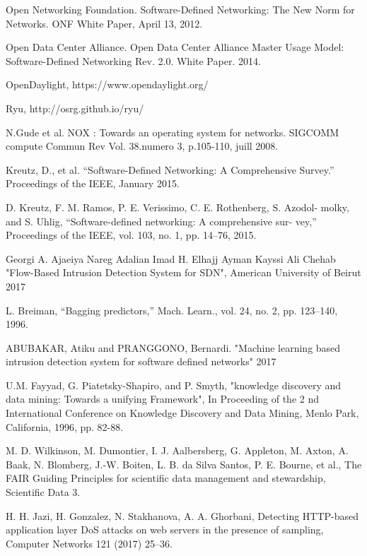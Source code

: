 \frontmatter
\begin{thebibliography}{9}

\bibitem{} 
Open Networking Foundation. Software-Defined Networking: The New Norm
for Networks. ONF White Paper, April 13, 2012.

\bibitem{} 
Open Data Center Alliance. Open Data Center
Alliance Master Usage Model: Software-Defined
Networking Rev. 2.0. White Paper. 2014.

\bibitem{} 
OpenDaylight, https://www.opendaylight.org/

\bibitem{} 
Ryu, http://osrg.github.io/ryu/

\bibitem{}
N.Gude et al. NOX : Towards an operating system for networks. SIGCOMM compute
Commun Rev Vol. 38.numero 3, p.105-110, juill 2008.

\bibitem{} 
Kreutz, D., et al. “Software-Defined Networking: A Comprehensive Survey.”
Proceedings of the IEEE, January 2015.

\bibitem{} 
D. Kreutz, F. M. Ramos, P. E. Verissimo, C. E. Rothenberg, S. Azodol-
molky, and S. Uhlig, “Software-defined networking: A comprehensive sur-
vey,” Proceedings of the IEEE, vol. 103, no. 1, pp. 14–76, 2015.

\bibitem{}
Georgi A. Ajaeiya Nareg Adalian Imad H. Elhajj Ayman Kayssi Ali Chehab "Flow-Based Intrusion Detection System for SDN", American University of Beirut 2017

\bibitem{}
L. Breiman, “Bagging predictors,” Mach. Learn., vol.
24, no. 2, pp. 123–140, 1996. 

\bibitem{}
ABUBAKAR, Atiku and PRANGGONO, Bernardi. "Machine learning based intrusion detection system for
software defined networks" 2017

\bibitem{}
U.M. Fayyad, G. Piatetsky-Shapiro, and P. Smyth, "knowledge discovery and data mining: Towards a unifying Framework", In Proceeding of the 2 nd International Conference on Knowledge Discovery and Data Mining, Menlo Park, California, 1996, pp. 82-88.

\bibitem{}
M. D. Wilkinson, M. Dumontier, I. J. Aalbersberg, G. Appleton, M. Axton, A. Baak, N. Blomberg, J.-W. Boiten, L. B. da Silva Santos, P. E. Bourne, et al., The FAIR Guiding Principles for scientific data
management and stewardship, Scientific Data 3.

\bibitem{}
H. H. Jazi, H. Gonzalez, N. Stakhanova, A. A. Ghorbani, Detecting HTTP-based application layer DoS attacks on web servers in the presence of sampling, Computer Networks 121 (2017) 25–36.


\end{thebibliography}
